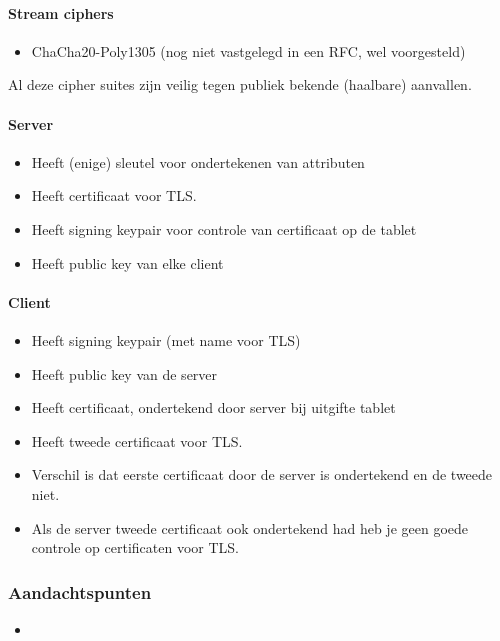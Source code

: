 \paragraph{Stream ciphers}
\begin{itemize}
	\item ChaCha20-Poly1305 (nog niet vastgelegd in een RFC, wel voorgesteld)
\end{itemize}

Al deze cipher suites zijn veilig tegen publiek bekende (haalbare) aanvallen.


\paragraph{Server}
\begin{itemize}
	\item Heeft (enige) sleutel voor ondertekenen van attributen
  \item Heeft certificaat voor TLS.
  \item Heeft signing keypair voor controle van certificaat op de tablet
  \item Heeft public key van elke client
\end{itemize}

\paragraph{Client}
\begin{itemize}
	\item Heeft signing keypair (met name voor TLS)
  \item Heeft public key van de server
  \item Heeft certificaat, ondertekend door server bij uitgifte tablet
  \item Heeft tweede certificaat voor TLS.
  \item Verschil is dat eerste certificaat door de server is ondertekend en de tweede niet.
  \item Als de server tweede certificaat ook ondertekend had heb je geen goede controle op certificaten voor TLS.
\end{itemize}

\subsubsection{Aandachtspunten}
\begin{itemize}
  \item 
\end{itemize}


